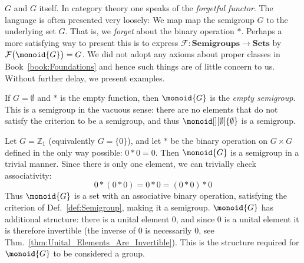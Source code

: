         $G$ and $G$ itself. In category theory one speaks of the
        \textit{forgetful functor}. The language is
        often presented very loosely: We map map the semigroup $G$ to the
        underlying set $G$. That is, we \textit{forget} about the binary
        operation $*$. Perhaps a more satisfying way to present this is to
        express $\mathcal{F}:\mathbf{Semigroups}\rightarrow\mathbf{Sets}$ by
        $\mathcal{F}\big(\monoid{G}\big)=G$. We did not adopt any axioms about
        proper classes in Book~\ref{book:Foundations} and hence such things are
        of little concern to us. Without further delay, we present examples.
        \begin{example}
            If $G=\emptyset$ and $*$ is the empty function, then $\monoid{G}$ is
            the \textit{empty semigroup}. This
            is a semigroup in the vacuous sense: there are no elements that do
            not satisfy the criterion to be a semigroup, and thus
            $\monoid[][\emptyset]{\emptyset}$ is a semigroup.
        \end{example}
        \begin{example}
            Let $G=\mathbb{Z}_{1}$ (equivalently $G=\{0\}$), and let $*$ be the
            binary operation on $G\times{G}$ defined in the only way possible:
            $0*0=0$. Then $\monoid{G}$ is a semigroup in a trivial manner. Since
            there is only one element, we can trivially check associativity:
            \begin{equation}
                0*(0*0)=0*0=(0*0)*0
            \end{equation}
            Thus $\monoid{G}$ is a set with an associative binary operation,
            satisfying the criterion of Def.~\ref{def:Semigroup}, making it a
            semigroup. $\monoid{G}$ has additional structure: there is a unital
            element 0, and since 0 is a unital element it is therefore invertible
            (the inverse of 0 is necessarily 0, see
            Thm.~\ref{thm:Unital_Elements_Are_Invertible}). This is the structure
            required for $\monoid{G}$ to be considered a group.
        \end{example}
